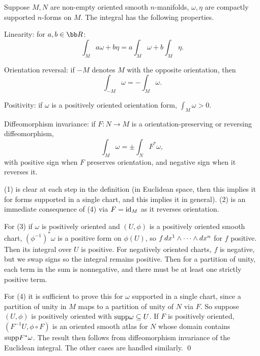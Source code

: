     Suppose $M,N$ are non-empty oriented smooth $n$-manifolds, $\omega,\eta$ are compactly supported $n$-forms on $M$.
    The integral has the following properties.

    \benum
        \item {\emphcolor Linearity}: for $a,b\in\bR$:
        $$ \int_M a\omega+b\eta = a\int_M\omega + b\int_M\eta . $$
        \item {\emphcolor Orientation reversal}: if $-M$ denotes $M$ with the opposite orientation, then
        $$ \int_{-M}\omega = -\int_M\omega . $$
        \item {\emphcolor Positivity}: if $\omega$ is a positively oriented orientation form, $\int_M\omega>0$.
        \item {\emphcolor Diffeomorphism invariance}: if $F\colon N\to M$ is a orientation-preserving
        or reversing diffeomorphism,
        $$ \int_M\omega = \pm\int_NF^*\omega , $$
        with positive sign when $F$ preserves orientation, and negative sign when it reverses it.
    \eenum

\eprop

\bproof

    (1) is clear at each step in the definition (in Euclidean space, then this implies it for forms supported in a single
    chart, and this implies it in general).
    (2) is an immediate consequence of (4) via $F={\rm id}_M$ as it reverses orientation.

    For (3) if $\omega$ is positively oriented and $(U,\phi)$ is a positively oriented smooth chart, $(\phi^{-1})^*\omega$
    is a positive form on $\phi(U)$, so $f\mathop{}\!d x^1\wedge\cdots\wedge\mathop{}\!d x^n$ for $f$ positive.
    Then its integral over $U$ is positive.
    For negatively oriented charts, $f$ is negative, but we swap signs so the integral remains positive.
    Then for a partition of unity, each term in the sum is nonnegative, and there must be at least one strictly positive term.

    For (4) it is sufficient to prove this for $\omega$ supported in a single chart, since a partition of unity
    in $M$ maps to a partition of unity of $N$ via $F$.
    So suppose $(U,\phi)$ is positively oriented with ${\rm supp}\omega\subseteq U$.
    If $F$ is positively oriented, $(F^{-1}U,\phi\circ F)$ is an oriented smooth atlas for $N$ whose domain
    contains ${\rm supp} F^*\omega$.
    The result then follows from diffeomorphism invariance of the Euclidean integral.
    The other cases are handled similarly.
    \qed

\eproof

